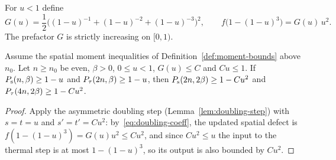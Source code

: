 \begin{definition}
  \label{def:doubling-coefficient}
  \leanok
  For \(u < 1\) define
  \begin{equation}
    \label{eq:doubling-coeff}
    G(u) = \frac{1}{2}\bigl((1-u)^{-1} + (1-u)^{-2} + (1-u)^{-3}\bigr)^2, \qquad
    f\bigl(1 - (1-u)^3\bigr) = G(u)\,u^2.
  \end{equation}
  The prefactor \(G\) is strictly increasing on \([0, 1)\).
\end{definition}

\begin{lemma}
  \label{lem:doubling-coefficient}
  \leanok
  Assume the spatial moment inequalities of Definition~\ref{def:moment-bounds} above \(n_0\). Let
  \(n \ge n_0\) be even, \(\beta > 0\), \(0 \le u < 1\), \(G(u) \le C\) and \(Cu \le 1\). If
  \(P_{\mathrm{s}}(n, \beta) \ge 1 - u\) and \(P_{\tau}(2n, \beta) \ge 1 - u\), then
  \(P_{\mathrm{s}}(2n, 2\beta) \ge 1 - Cu^2\) and \(P_{\tau}(4n, 2\beta) \ge 1 - Cu^2\).
\end{lemma}
\begin{proof}
  \leanok
  Apply the asymmetric doubling step (Lemma~\ref{lem:doubling-step}) with \(s = t = u\) and
  \(s' = t' = Cu^2\): by~\eqref{eq:doubling-coeff}, the updated spatial defect is
  \(f(1 - (1-u)^3) = G(u) u^2 \le Cu^2\), and since \(Cu^2 \le u\) the input to the thermal step is
  at most \(1 - (1-u)^3\), so its output is also bounded by \(Cu^2\).
\end{proof}


